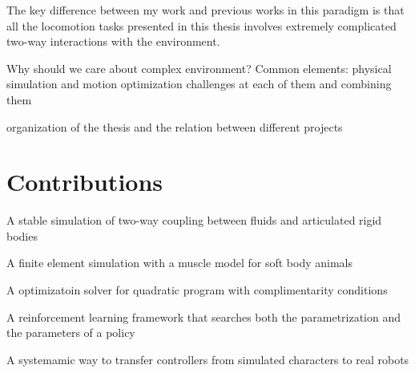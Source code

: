 The key difference between my work and previous works in this paradigm is that all the locomotion tasks presented in this thesis involves extremely complicated two-way interactions with the environment.


Why should we care about complex environment?
Common elements: physical simulation and motion optimization
challenges at each of them and combining them

organization of the thesis and the relation between different projects


\section{Contributions}

A stable simulation of two-way coupling between fluids and articulated rigid bodies

A finite element simulation with a muscle model for soft body animals

A optimizatoin solver for quadratic program with complimentarity conditions

A reinforcement learning framework that searches both the parametrization and the parameters of a policy

A systemamic way to transfer controllers from simulated characters to real robots

